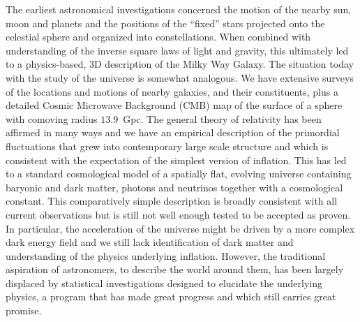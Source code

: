 \documentclass[useAMS,usenatbib,a4paper]{mn2e}
\begin{document}
The earliest astronomical investigations concerned the motion of the
nearby sun, moon and planets  and the positions of the ``fixed'' stars
projected onto the celestial sphere and organized into constellations.
When combined with understanding of the inverse square laws of light
and gravity, this ultimately led to a physics-based, 3D description of
the Milky Way Galaxy. The situation today with the study of the
universe is somewhat analogous. We have extensive surveys of the
locations and motions of nearby galaxies, and their constituents, plus
a detailed Cosmic Microwave Background (CMB) map of the surface of a
sphere with comoving radius $13.9$~Gpc. The general theory of
relativity has been affirmed in many ways and we have an empirical
description of the primordial fluctuations that grew into contemporary
large scale structure and which is consistent with the expectation of
the simplest version of inflation. This has led to a standard
cosmological model of a spatially flat, evolving universe containing
baryonic and dark matter, photons and neutrinos together with a
cosmological constant. This comparatively simple description is
broadly consistent with all current observations but is still not well
enough tested to be accepted as proven. In particular, the
acceleration of the universe might be driven by a more complex dark
energy field and we still lack identification of dark matter and
understanding of the physics underlying inflation. However, the
traditional aspiration of astronomers, to describe the world around
them, has been largely displaced by statistical investigations
designed to elucidate the underlying physics, a program that has made
great progress and which still carries great promise.
\end{document}
